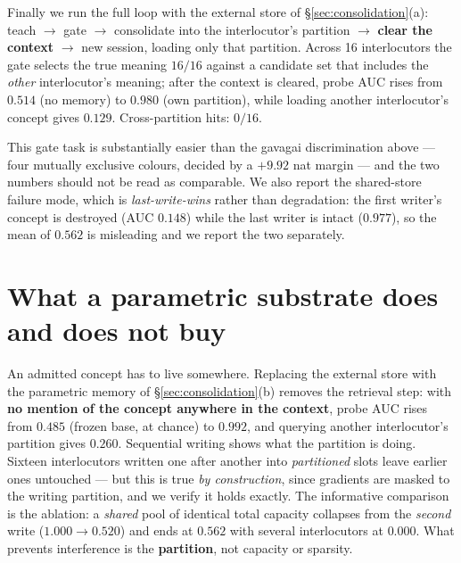 \documentclass[11pt]{article}
\begin{document}
Finally we run the full loop with the external store of \S\ref{sec:consolidation}(a):
teach $\to$ gate $\to$ consolidate into the interlocutor's partition $\to$ \textbf{clear
the context} $\to$ new session, loading only that partition. Across 16 interlocutors the
gate selects the true meaning $16/16$ against a candidate set that includes the
\emph{other} interlocutor's meaning; after the context is cleared, probe AUC rises from
$0.514$ (no memory) to $0.980$ (own partition), while loading another interlocutor's
concept gives $0.129$. Cross-partition hits: $0/16$.

This gate task is substantially easier than the gavagai discrimination above --- four
mutually exclusive colours, decided by a $+9.92$ nat margin --- and the two numbers should
not be read as comparable. We also report the shared-store failure mode, which is
\emph{last-write-wins} rather than degradation: the first writer's concept is destroyed
(AUC $0.148$) while the last writer is intact ($0.977$), so the mean of $0.562$ is
misleading and we report the two separately.

\section{What a parametric substrate does and does not buy}
\label{sec:substrate}

An admitted concept has to live somewhere. Replacing the external store with the parametric
memory of \S\ref{sec:consolidation}(b) removes the retrieval step: with \textbf{no mention
of the concept anywhere in the context}, probe AUC rises from $0.485$ (frozen base, at
chance) to $0.992$, and querying another interlocutor's partition gives $0.260$. Sequential
writing shows what the partition is doing. Sixteen interlocutors written one after another
into \emph{partitioned} slots leave earlier ones untouched --- but this is true \emph{by
construction}, since gradients are masked to the writing partition, and we verify it holds
exactly. The informative comparison is the ablation: a \emph{shared} pool of identical total
capacity collapses from the \emph{second} write ($1.000 \to 0.520$) and ends at $0.562$
with several interlocutors at $0.000$. What prevents interference is the \textbf{partition},
not capacity or sparsity.
\end{document}

